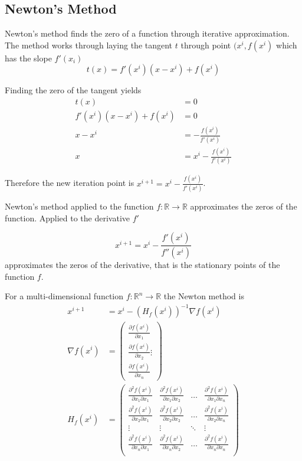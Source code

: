 \documentclass[11pt]{article}
\begin{document}
\subsection{Newton's Method}

Newton's method finds the zero of a function through iterative approximation. The method works through laying the tangent $t$ through point $(x^i, f(x^i)$ which has the slope $f'(x_i)$
\begin{equation*}
	t(x) = f'(x^i)(x-x^i) + f(x^i)
\end{equation*}

\noindent
Finding the zero of the tangent yields
\begin{align*}
	t(x) &= 0\\
	f'(x^i)(x-x^i) + f(x^i) &= 0\\
	x - x^i &= - \frac{f(x^i)}{f'(x^i)}\\
	x &= x^i - \frac{f(x^i)}{f'(x^i)}
\end{align*}

\noindent
Therefore the new iteration point is $x^{i+1} = x^i - \frac{f(x^i)}{f'(x^i)}$.

Newton's method applied to the function $f: \mathbb{R} \rightarrow \mathbb{R}$ approximates the zeros of the function. Applied to the derivative $f'$

\begin{equation*}
	x^{i+1} = x^i - \frac{f'(x^i)}{f''(x^i)}
\end{equation*}
\noindent
approximates the zeros of the derivative, that is the stationary points of the function $f$.

For a multi-dimensional function $f: \mathbb{R}^n \rightarrow \mathbb{R}$ the Newton method is
\begin{align*}
	x^{i+1} &= x^i -(H_f(x^i))^{-1} \nabla f(x^i)\\
	\nabla f(x^i) &= \begin{pmatrix}
		\frac{\partial f(x^i)}{\partial x_1}\\
		\frac{\partial f(x^i)}{\partial x_2}
		\vdots\\
		\frac{\partial f(x^i)}{\partial x_n}
	\end{pmatrix}\\
	H_f(x^i) &= \begin{pmatrix}
	\frac{\partial^2 f(x^i)}{\partial x_1\partial x_1} & \frac{\partial^2 f(x^i)}{\partial x_1\partial x_2} & \dots & \frac{\partial^2 f(x^i)}{\partial x_1\partial x_n}\\
	\frac{\partial^2 f(x^i)}{\partial x_2\partial x_1} & \frac{\partial^2 f(x^i)}{\partial x_2\partial x_2} & \dots & \frac{\partial^2 f(x^i)}{\partial x_2\partial x_n}\\
	\vdots & \vdots & \ddots & \vdots\\
	\frac{\partial^2 f(x^i)}{\partial x_n\partial x_1} & \frac{\partial^2 f(x^i)}{\partial x_n\partial x_2} & \dots & \frac{\partial^2 f(x^i)}{\partial x_n\partial x_n}\\
	\end{pmatrix}
\end{align*}
\end{document}
